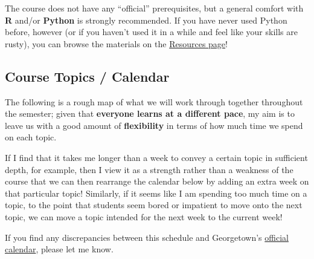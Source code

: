 \documentclass[
]{scrartcl}
\begin{document}
The course does not have any ``official'' prerequisites, but a general
comfort with \textbf{R} and/or \textbf{Python} is strongly recommended.
If you have never used Python before, however (or if you haven't used it
in a while and feel like your skills are rusty), you can browse the
materials on the \href{resources.qmd}{Resources page}!

\subsection{Course Topics / Calendar}\label{course-topics-calendar}

The following is a rough map of what we will work through together
throughout the semester; given that \textbf{everyone learns at a
different pace}, my aim is to leave us with a good amount of
\textbf{flexibility} in terms of how much time we spend on each topic.

If I find that it takes me longer than a week to convey a certain topic
in sufficient depth, for example, then I view it as a strength rather
than a weakness of the course that we can then rearrange the calendar
below by adding an extra week on that particular topic! Similarly, if it
seems like I am spending too much time on a topic, to the point that
students seem bored or impatient to move onto the next topic, we can
move a topic intended for the next week to the current week!

If you find any discrepancies between this schedule and Georgetown's
\href{https://registrar.georgetown.edu/academic-calendar/maincampus/}{official
calendar}, please let me know.
\end{document}
